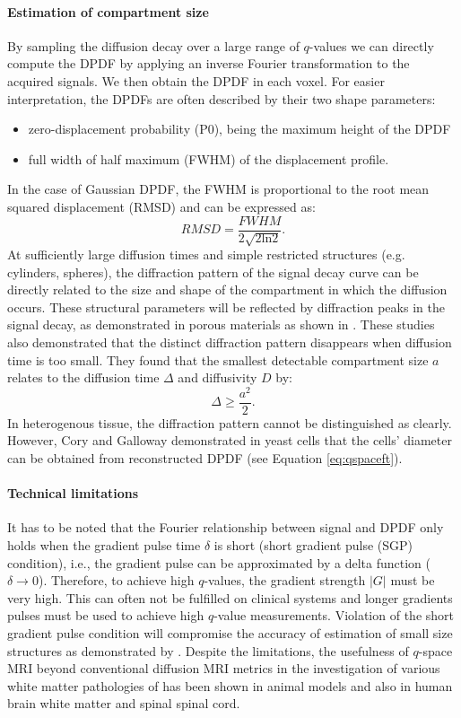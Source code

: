 \paragraph*{Estimation of compartment size}
By sampling the diffusion decay over a large range of $q$-values we can directly compute the DPDF by applying an inverse Fourier transformation to the acquired signals. We then obtain the DPDF in each voxel. For easier interpretation, the DPDFs are often described by their two shape parameters:
\begin{itemize}
	\item zero-displacement probability (P0), being the maximum height of the DPDF
	\item full width of half maximum (FWHM) of the displacement profile.
\end{itemize}
In the case of Gaussian DPDF, the FWHM is proportional to the root mean squared displacement (RMSD)\cite{cory90} and can be expressed as:
\begin{equation}
	RMSD = \frac{FWHM}{2\sqrt{2\mbox{ln}2}}.
\end{equation}
At sufficiently large diffusion times and simple restricted structures (e.g. cylinders, spheres), the diffraction pattern of the signal decay curve can be directly related to the size and shape of the compartment in which the diffusion occurs. These structural parameters will be reflected by diffraction peaks in the signal decay, as demonstrated in porous materials as shown in \cite{TODO}. These studies also demonstrated that the distinct diffraction pattern disappears when diffusion time is too small. They found that the smallest detectable compartment size $a$ relates to the diffusion time $\Delta$ and diffusivity $D$ by:
\begin{equation}
	\Delta \ge \frac{a^2}{2}.
\end{equation}   
In heterogenous tissue, the diffraction pattern cannot be distinguished as clearly. However, Cory and Galloway demonstrated in yeast cells that the cells’ diameter can be obtained from reconstructed DPDF (see Equation \ref{eq:qspaceft}).
\paragraph*{Technical limitations}
It has to be noted that the Fourier relationship between signal and DPDF only holds when the gradient pulse time $\delta$ is short (short gradient pulse (SGP) condition), i.e., the gradient pulse can be approximated by a delta function ($\delta\rightarrow 0$). Therefore, to achieve high $q$-values, the gradient strength $|G|$ must be very high. This can often not be fulfilled on clinical systems and longer gradients pulses must be used to achieve high $q$-value measurements. Violation of the short gradient pulse condition will compromise the accuracy of estimation of small size structures as demonstrated by \cite{laett07,TODO}. Despite the limitations, the usefulness of $q$-space MRI beyond conventional diffusion MRI metrics in the investigation of various white matter pathologies of has been shown in animal models \cite{TODO} and also in human brain white matter\cite{TODO} and spinal spinal cord\cite{TODO}.  


